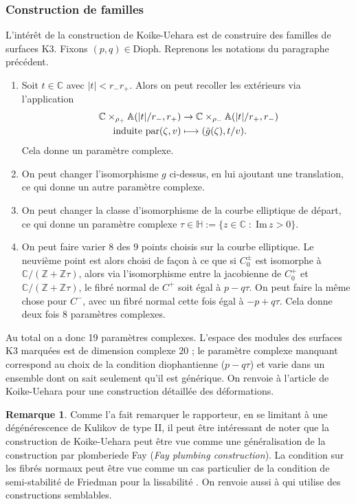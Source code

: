 \documentclass[JEP,XML,SOM,Unicode,francais,published]{cedram}
\newcommand\mto{\mathchoice{\longmapsto}{\mapsto}{\mapsto}{\mapsto}}
\newcommand{\Z}{\mathbb{Z}}
\newcommand{\C}{\mathbb{C}}
\theoremstyle{definition}
\newtheorem{rem}[thm]{Remarque}
\begin{document}
\subsubsection*{Construction de familles}
L'intérêt de la construction de Koike-Uehara est de construire des familles de surfaces K3. Fixons $(p,q) \in \mathrm{Dioph}$. Reprenons les notations du paragraphe précédent.
\begin{enumerate}
\item Soit $t \in \C$ avec $|t| < r_{-}r_{+}$. Alors on peut recoller les extérieurs via l'application
\begin{align*}
\C \times_{\rho_{+}} \mathbb{A}(|t|/r_{-}, r_{+}) &\to \C \times_{\rho_{-}} \mathbb{A}(|t|/r_{+}, r_{-})\\
\tag*{induite par}
(\zeta, v) &\mto (\tilde{g}(\zeta), t/v).
\end{align*}
Cela donne un paramètre complexe.
\item On peut changer l'isomorphisme $g$ ci-dessus, en lui ajoutant une translation, ce qui donne un autre paramètre complexe.
\item On peut changer la classe d'isomorphisme de la courbe elliptique de départ, ce qui donne un paramètre complexe $\tau \in \mathbb{H}:=\{z\in \C\;:\;\mathrm{Im}\,z > 0\}$.
\item On peut faire varier 8 des 9 points choisis sur la courbe elliptique. Le neuvième point est alors choisi de façon à ce que si $C_0^\pm$ est isomorphe à $\C/(\Z + \Z\tau)$, alors via l'isomorphisme entre la jacobienne de $C_0^+$ et $\C/(\Z + \Z\tau)$, le fibré normal de $C^{+}$ soit égal à $p - q\tau$.
On peut faire la même chose pour $C^{-}$, avec un fibré normal cette fois égal à $-p + q\tau$. Cela donne deux fois 8 paramètres complexes.
\end{enumerate}
Au total on a donc 19 paramètres complexes. L'espace des modules des surfaces K3 marquées est de dimension complexe $20$ ; le paramètre complexe manquant correspond au choix de la condition diophantienne (\ie $p - q\tau$) et varie dans un ensemble dont on sait seulement qu'il est générique. On renvoie à l'article de Koike-Uehara \cite[\S\,4]{koike2019gluing} pour une construction détaillée des déformations.

\begin{rem}\label{rem:rap}
Comme l'a fait remarquer le rapporteur, en se limitant à une dégénérescence de Kulikov de type II, il peut être intéressant de noter que la construction de Koike-Uehara peut être vue comme une généralisation de la construction par \og plomberie\fg de Fay (\textit{Fay plumbing construction}). La condition sur les fibrés normaux peut être vue comme un cas particulier de la condition de semi-stabilité de Friedman pour la lissabilité \cite{Friedman}. On renvoie aussi à \cite{Friedman2} qui utilise des constructions semblables.
\end{rem}
\end{document}
